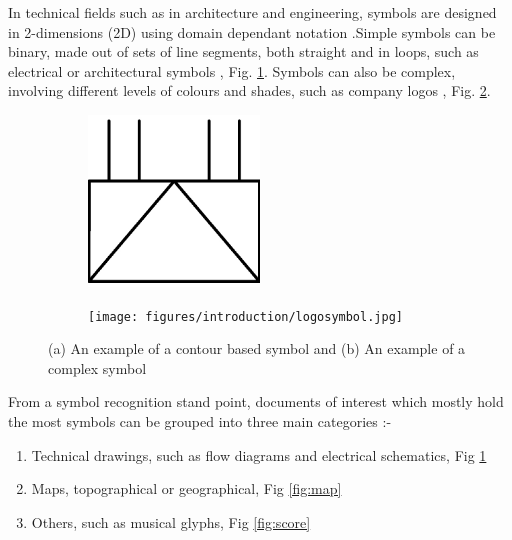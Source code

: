 In technical fields such as in architecture and engineering, symbols are designed in 2-dimensions (2D) using domain dependant notation \cite{Llados}.Simple symbols can be binary, made out of sets of line segments, both straight and in loops, such as electrical or architectural symbols , Fig. \ref{fig:electrical}. Symbols can also be complex, involving different levels of colours and shades, such as company logos \cite{Cordella_2000}, Fig. \ref{fig:logo}. \\

\begin{figure}[h]
        \centering
        \begin{subfigure}[b]{0.4\textwidth}
                \centering
                \includegraphics[width=0.5\textwidth]{figures/introduction/electricalsymbol.jpg}
                \caption{}
                \label{fig:electrical}
        \end{subfigure}
        \begin{subfigure}[b]{0.4\textwidth}
                \centering
                \texttt{[image: figures/introduction/logosymbol.jpg]}
                \caption{}
                \label{fig:logo}
        \end{subfigure}
        \caption[Example of Symbols]{(a) An example of a contour based symbol and (b) An example of a complex symbol}
        \label{fig:symbolexamples}
\end{figure}

From a symbol recognition stand point, documents of interest which mostly hold the most symbols can be grouped into three main categories \cite{Cordella_2000} :-

    \begin{enumerate}
        \item Technical drawings, such as flow diagrams and electrical schematics, Fig \ref{fig:electrical}
        \item Maps, topographical or geographical, Fig \ref{fig:map}
        \item Others, such as musical glyphs, Fig \ref{fig:score}
    \end{enumerate}

